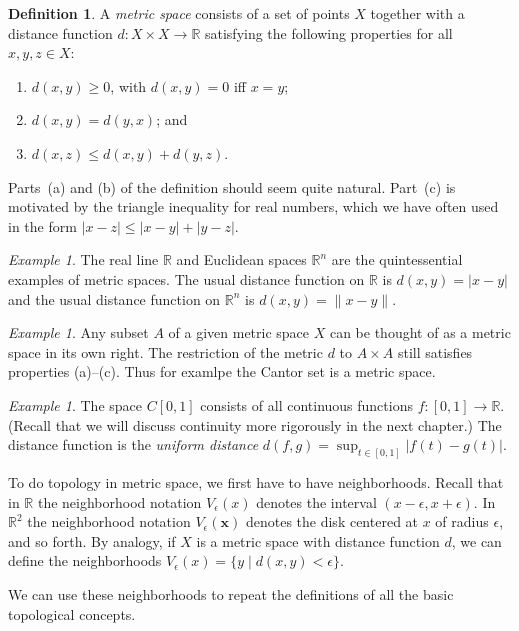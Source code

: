 \documentclass[11pt,oneside]{amsbook}
\newcommand{\RR}{\mathbb R}
\theoremstyle{definition}
\theoremstyle{plain}
\theoremstyle{definition}
\newtheorem{defn}[thm]{Definition}
\theoremstyle{remark}
\newtheorem{example}[thm]{Example}
\numberwithin{equation}{section}
\numberwithin{figure}{section}
\begin{document}
\begin{defn}
  A \emph{metric space} consists of a set of points $X$ together with a distance function $d\colon X\times X\to\RR$ satisfying the following properties for all $x,y,z\in X$:
  \begin{enumerate}
  \item $d(x,y)\geq0$, with $d(x,y)=0$ iff $x=y$;
  \item $d(x,y)=d(y,x)$; and
  \item $d(x,z)\leq d(x,y)+d(y,z)$.
  \end{enumerate}
\end{defn}

Parts~(a) and (b) of the definition should seem quite natural. Part~(c) is motivated by the triangle inequality for real numbers, which we have often used in the form $|x-z|\leq|x-y|+|y-z|$.

\begin{example}
  The real line $\RR$ and Euclidean spaces $\RR^n$ are the quintessential examples of metric spaces. The usual distance function on $\RR$ is $d(x,y)=|x-y|$ and the usual distance function on $\RR^n$ is $d(x,y)=\|x-y\|$.
\end{example}

\begin{example}
  Any subset $A$ of a given metric space $X$ can be thought of as a metric space in its own right. The restriction of the metric $d$ to $A\times A$ still satisfies properties (a)--(c). Thus for examlpe the Cantor set is a metric space.
\end{example}

\begin{example}
  The space $C[0,1]$ consists of all continuous functions $f\colon[0,1]\to\RR$. (Recall that we will discuss continuity more rigorously in the next chapter.) The distance function is the \emph{uniform distance} $d(f,g)=\sup_{t\in[0,1]}|f(t)-g(t)|$.
\end{example}

To do topology in metric space, we first have to have neighborhoods. Recall that in $\RR$ the neighborhood notation $V_\epsilon(x)$ denotes the interval $(x-\epsilon,x+\epsilon)$. In $\RR^2$ the neighborhood notation $V_\epsilon(\mathbf{x})$ denotes the disk centered at $x$ of radius $\epsilon$, and so forth. By analogy, if $X$ is a metric space with distance function $d$, we can define the neighborhoods $V_\epsilon(x)=\{y\mid d(x,y)<\epsilon\}$.

We can use these neighborhoods to repeat the definitions of all the basic topological concepts.
\end{document}
